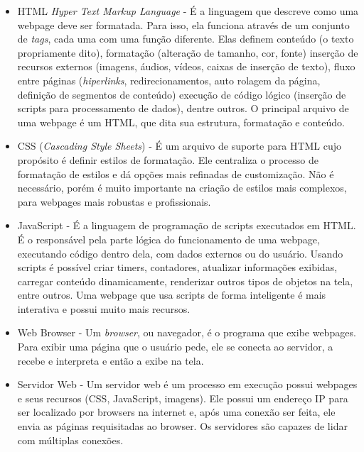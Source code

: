 \documentclass[a4paper,12pt]{article}
\begin{document}
\begin{itemize}
    \item HTML \emph{Hyper Text Markup Language} - É a linguagem que descreve como uma webpage deve ser formatada. Para isso, ela funciona através de um conjunto de \emph{tags}, cada uma com uma função diferente. Elas definem conteúdo (o texto propriamente dito), formatação (alteração de tamanho, cor, fonte) inserção de recursos externos (imagens, áudios, vídeos, caixas de inserção de texto), fluxo entre páginas (\emph{hiperlinks}, redirecionamentos, auto rolagem da página, definição de segmentos de conteúdo) execução de código lógico (inserção de scripts para processamento de dados), dentre outros. O principal arquivo de uma webpage é um HTML, que dita sua estrutura, formatação e conteúdo.

    \item CSS (\emph{Cascading Style Sheets}) - É um arquivo de suporte para HTML cujo propósito é definir estilos de formatação. Ele centraliza o processo de formatação de estilos e dá opções mais refinadas de customização. Não é necessário, porém é muito importante na criação de estilos mais complexos, para webpages mais robustas e profissionais.

    \item JavaScript - É a linguagem de programação de scripts executados em HTML. É o responsável pela parte lógica do funcionamento de uma webpage, executando código dentro dela, com dados externos ou do usuário. Usando scripts é possível criar timers, contadores, atualizar informações exibidas, carregar conteúdo dinamicamente, renderizar outros tipos de objetos na tela, entre outros. Uma webpage que usa scripts de forma inteligente é mais interativa e possui muito mais recursos.

    \item Web Browser - Um \emph{browser}, ou navegador, é o programa que exibe webpages. Para exibir uma página que o usuário pede, ele se conecta ao servidor, a recebe e interpreta e então a exibe na tela.

    \item Servidor Web - Um servidor web é um processo em execução possui webpages e seus recursos (CSS, JavaScript, imagens). Ele possui um endereço IP para ser localizado por browsers na internet e, após uma conexão ser feita, ele envia as páginas requisitadas ao browser. Os servidores são capazes de lidar com múltiplas conexões.

\end{itemize}
\end{document}
